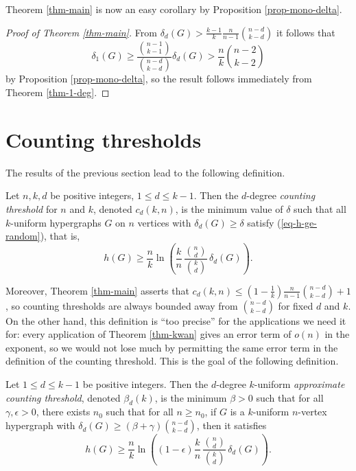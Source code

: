 \documentclass[11pt]{article}
\begin{document}
Theorem \ref{thm-main} is now an easy corollary by Proposition \ref{prop-mono-delta}.

\begin{proof}[Proof of Theorem \ref{thm-main}]
    From $\delta_d(G)> \frac{k-1}{k}\frac{n}{n-1}\binom{n-d}{k-d}$ it follows that
    $$\delta_1(G)\ge \frac{\binom{n-1}{k-1}}{\binom{n-d}{k-d}}\delta_d(G) > \frac{n}{k}\binom{n-2}{k-2}$$
    by Proposition \ref{prop-mono-delta}, so the result follows immediately from Theorem \ref{thm-1-deg}.
\end{proof}

\section{Counting thresholds}\label{sec-count}

The results of the previous section lead to the following definition.

\begin{definition}\label{def-count}
    Let $n,k,d$ be positive integers, $1\le d\le k-1$. Then the $d$-degree \emph{counting threshold} for $n$ and $k$, denoted $c_d(k,n)$, is the minimum value of $\delta$ such that all $k$-uniform hypergraphs $G$ on $n$ vertices with $\delta_d(G)\ge \delta$ satisfy (\ref{eq-h-ge-random}), that is,
    $$h(G)\ge\frac{n}{k}\ln\left(\frac{k}{n}\,\frac{\binom{n}{d}}{\binom{k}{d}}\,\delta_d(G)\right).$$
\end{definition}

Moreover, Theorem \ref{thm-main} asserts that $c_d(k,n)\le(1-\frac{1}{k })\frac{n }{n-1}\binom{n-d}{k-d}+1$, so counting thresholds are always bounded away from $\binom{n-d }{k-d}$ for fixed $d$ and $k$. On the other hand, this definition is ``too precise'' for the applications we need it for: every application of Theorem \ref{thm-kwan} gives an error term of $o(n)$ in the exponent, so we would not lose much by permitting the same error term in the definition of the counting threshold. This is the goal of the following definition.

\begin{definition}\label{def-approx-count}
    Let $1\le d\le k-1$ be positive integers. Then the $d$-degree $k$-uniform \emph{approximate counting threshold}, denoted $\beta_d(k)$, is the minimum $\beta>0$ such that for all $\gamma,\epsilon>0$, there exists $n_0$ such that for all $n\ge n_0$, if $G$ is a $k$-uniform $n$-vertex hypergraph with $\delta_d(G)\ge(\beta+\gamma)\binom{n-d}{k-d}$, then it satisfies
    $$h(G)\ge \frac{n}{k}\ln\left((1-\epsilon)\frac{k}{n}\,\frac{\binom{n}{d}}{\binom{k}{d}}\,\delta_d(G)\right).$$
\end{definition}
\end{document}
